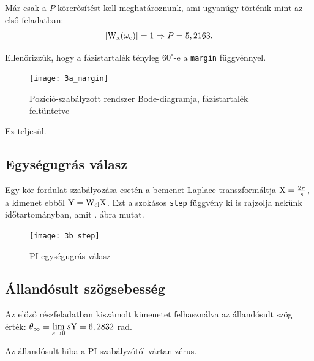 Már csak a $P$ körerősítést kell meghatároznunk, ami ugyanúgy történik mint az első feladatban:
\begin{equation}
	\left\lvert \mathrm{W}_\text{x}(\omega_\text{c}) \right\rvert = 1 \Rightarrow P = 5,2163.
\end{equation}

Ellenőrizzük, hogy a fázistartalék tényleg $60^\circ$-e a \verb|margin| függvénnyel.
\begin{figure}[H]
	\centering
	\texttt{[image: 3a\_margin]}
	\caption{Pozíció-szabályzott rendszer Bode-diagramja, fázistartalék feltüntetve}
	\label{fig:3a_margin}
\end{figure}

Ez teljesül.


\subsection{Egységugrás válasz}

Egy kör fordulat szabályozása esetén a bemenet Laplace-transzformáltja $\mathrm{X}=\frac{2\pi}{s}$,
a kimenet ebből $\mathrm{Y} = \mathrm{W}_\text{cl}\mathrm{X}$. Ezt a szokásos \verb|step| függvény
ki is rajzolja nekünk időtartományban, amit . ábra mutat.

\begin{figure}[H]
	\centering
	\texttt{[image: 3b\_step]}
	\caption{PI egységugrás-válasz}
	\label{fig:3b_step}
\end{figure}


\subsection{Állandósult szögsebesség}

Az előző részfeladatban kiszámolt kimenetet felhasználva az állandósult szög érték:
$\theta_\infty = \lim\limits_{s\rightarrow 0}s\mathrm{Y} = 6,2832$ rad.

Az állandósult hiba a PI szabályzótól vártan zérus.

